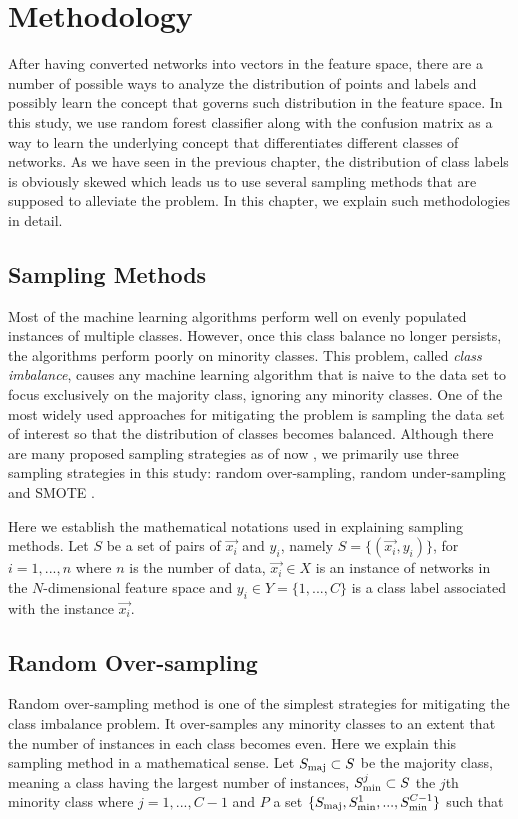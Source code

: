 \section*{Methodology}
After having converted networks into vectors in the feature space, there are a number of possible ways to analyze the distribution of points and labels and possibly learn the concept that governs such distribution in the feature space. In this study, we use random forest classifier along with the confusion matrix as a way to learn the underlying concept that differentiates different classes of networks. As we have seen in the previous chapter, the distribution of class labels is obviously skewed which leads us to use several sampling methods that are supposed to alleviate the problem. In this chapter, we explain such methodologies in detail.

	\subsection*{Sampling Methods}
Most of the machine learning algorithms perform well on evenly populated instances of multiple classes. However, once this class balance no longer persists, the algorithms perform poorly on minority classes. This problem, called \textit{class imbalance}, causes any machine learning algorithm that is naive to the data set to focus exclusively on the majority class, ignoring any minority classes. One of the most widely used approaches for mitigating the problem is sampling the data set of interest so that the distribution of classes becomes balanced. Although there are many proposed sampling strategies as of now \cite{SurveySampling}, we primarily use three sampling strategies in this study: random over-sampling, random under-sampling and SMOTE \cite{SMOTE}.

 Here we establish the mathematical notations used in explaining sampling methods. Let $S$ be a set of pairs of $\vec{x_i}$ and $y_i$, namely $S =\{(\vec{x_i},y_i)\}$, for $i = 1,...,n$ where $n$ is the number of data, $\vec{x_i} \in X$ is an instance of networks in the $N$-dimensional feature space and $y_i \in Y = \{1,...,C\}$ is a class label associated with the instance $\vec{x_i}$.   


		\subsection{Random Over-sampling}
		Random over-sampling method is one of the simplest strategies for mitigating the class imbalance problem. It over-samples any minority classes to an extent that the number of instances in each class becomes even. Here we explain this sampling method in a mathematical sense. Let $S_{\rm{maj}} \subset S$ be the majority class, meaning a class having the largest number of instances, $S_{\rm{min}}^{j} \subset S$ the $j$th minority class where $j = 1,...,C-1$ and $P$ a set $\{S_{\rm{maj}}, S_{\rm{min}}^{1},...,S_{\rm{min}}^{C-1} \}$ such that
	
